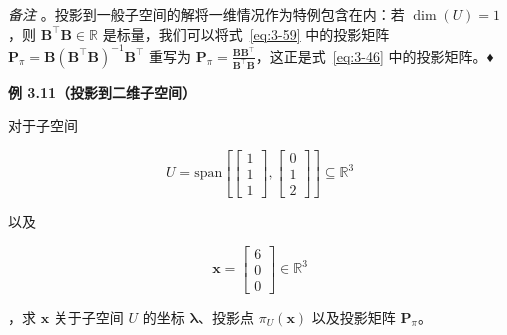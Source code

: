 \emph{备注} 。投影到一般子空间的解将一维情况作为特例包含在内：若 $ \dim(U) = 1 $，则 $ \boldsymbol{B}^\top \boldsymbol{B} \in \mathbb{R} $ 是标量，我们可以将式~\eqref{eq:3-59} 中的投影矩阵 $ \boldsymbol{P}_\pi = \boldsymbol{B} (\boldsymbol{B}^\top \boldsymbol{B})^{-1} \boldsymbol{B}^\top $ 重写为 $ \boldsymbol{P}_\pi = \frac{\boldsymbol{B} \boldsymbol{B}^\top}{\boldsymbol{B}^\top \boldsymbol{B}} $，这正是式~\eqref{eq:3-46} 中的投影矩阵。♦

\begin{notebox}
\textbf{例 3.11（投影到二维子空间）}
\end{notebox}

\begin{notebox}
对于子空间

\begin{equation*}
U = \text{span}\left[\begin{bmatrix} 1 \\ 1 \\ 1 \end{bmatrix}, \begin{bmatrix} 0 \\ 1 \\ 2 \end{bmatrix}\right] \subseteq \mathbb{R}^3
\end{equation*}

以及

\begin{equation*}
\boldsymbol{x} = \begin{bmatrix} 6 \\ 0 \\ 0 \end{bmatrix} \in \mathbb{R}^3
\end{equation*}

，求 $ \boldsymbol{x} $ 关于子空间 $ U $ 的坐标 $ \boldsymbol{\lambda} $、投影点 $ \pi_U(\boldsymbol{x}) $ 以及投影矩阵 $ \boldsymbol{P}_\pi $。
\end{notebox}

